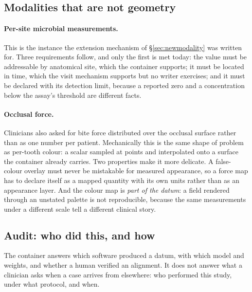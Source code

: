\documentclass[11pt,a4paper]{article}
\begin{document}
\subsection{Modalities that are not geometry}

\paragraph{Per-site microbial measurements.} This is the instance the extension mechanism of
\S\ref{sec:newmodality} was written for. Three requirements follow, and only the first is
met today: the value must be addressable by anatomical site, which the container supports;
it must be located in time, which the visit mechanism supports but no writer exercises; and
it must be declared with its detection limit, because a reported zero and a concentration
below the assay's threshold are different facts.

\paragraph{Occlusal force.} Clinicians also asked for bite force distributed over the
occlusal surface rather than as one number per patient. Mechanically this is the same shape
of problem as per-tooth colour: a scalar sampled at points and interpolated onto a surface the
container already carries. Two properties make it more delicate. A false-colour overlay must
never be mistakable for measured appearance, so a force map has to declare itself as a mapped
quantity with its own units rather than as an appearance layer. And the colour map is
\emph{part of the datum}: a field rendered through an unstated palette is not reproducible,
because the same measurements under a different scale tell a different clinical story.

\subsection{Audit: who did this, and how}

The container answers which software produced a datum, with which model and weights, and
whether a human verified an alignment. It does not answer what a clinician asks when a case
arrives from elsewhere: who performed this study, under what protocol, and when.
\end{document}

